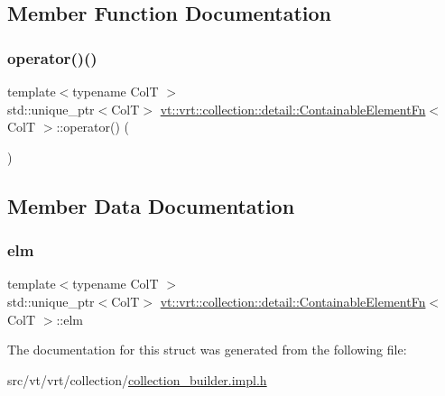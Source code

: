 \subsection{Member Function Documentation}
\mbox{\label{structvt_1_1vrt_1_1collection_1_1detail_1_1_containable_element_fn_aba8062d316a87a8e199455e589eac499}} 
\subsubsection{\texorpdfstring{operator()()}{operator()()}}
{\footnotesize\ttfamily template$<$typename ColT $>$ \\
std\+::unique\+\_\+ptr$<$ColT$>$ \hyperlink{structvt_1_1vrt_1_1collection_1_1detail_1_1_containable_element_fn}{vt\+::vrt\+::collection\+::detail\+::\+Containable\+Element\+Fn}$<$ ColT $>$\+::operator() (\begin{DoxyParamCaption}\item[{\hyperlink{structvt_1_1vrt_1_1collection_1_1detail_1_1_containable_element_fn_a8b72c632bf735826e02f41f6d89df5d9}{Index\+Type}}]{ }\end{DoxyParamCaption})\hspace{0.3cm}{\ttfamily [inline]}}



\subsection{Member Data Documentation}
\mbox{\label{structvt_1_1vrt_1_1collection_1_1detail_1_1_containable_element_fn_a7db28b6272022df76cf9eb5dd8a20048}} 
\subsubsection{\texorpdfstring{elm}{elm}}
{\footnotesize\ttfamily template$<$typename ColT $>$ \\
std\+::unique\+\_\+ptr$<$ColT$>$ \hyperlink{structvt_1_1vrt_1_1collection_1_1detail_1_1_containable_element_fn}{vt\+::vrt\+::collection\+::detail\+::\+Containable\+Element\+Fn}$<$ ColT $>$\+::elm}



The documentation for this struct was generated from the following file\+:\begin{DoxyCompactItemize}
\item 
src/vt/vrt/collection/\hyperlink{collection__builder_8impl_8h}{collection\+\_\+builder.\+impl.\+h}\end{DoxyCompactItemize}
